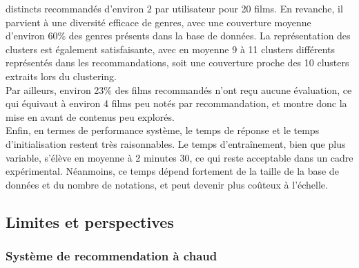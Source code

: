 \documentclass{article}
\begin{document}
    distincts recommandés d’environ 2 par utilisateur pour 20 films. En revanche, il parvient à une  
    diversité efficace de genres, avec une couverture moyenne d’environ 60\% des genres présents dans la base de données. 
    La représentation des clusters est également satisfaisante, avec en moyenne 9 à 11 clusters différents représentés dans 
    les recommandations, soit une couverture proche des 10 clusters extraits lors du clustering.\\
    Par ailleurs, environ 23\% des films recommandés n’ont reçu aucune évaluation, ce qui équivaut à environ 4 films peu notés 
    par recommandation, et montre donc la mise en avant de contenus peu explorés.\\
    Enfin, en termes de performance système, le temps de réponse et le temps d’initialisation restent très raisonnables. Le temps d’entraînement, bien que plus variable, s’élève en moyenne à 2 minutes 30, ce qui reste acceptable dans un cadre expérimental. Néanmoins, ce temps dépend fortement de la taille de la base de données et du nombre de notations, et peut devenir plus coûteux à l’échelle.

    \subsection{Limites et perspectives}
    \subsubsection{Système de recommendation à chaud}
    $ $\\
    \\
    \\
    \\
    \\
    \\
    \\
\end{document}
